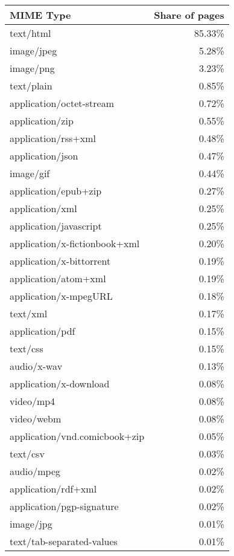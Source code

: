 \ifdgruyter
\begin{center}
\label{table:mime types}
\begin{supertabular}[H]{l|r}
    \textbf{MIME Type} & \textbf{Share of pages}\\
	\hline
	\hline
	text/html			&	85.33\% \\
	\hline
	image/jpeg			&	5.28\% \\
	\hline
	image/png			&	3.23\% \\
	\hline
	text/plain			&	0.85\% \\
	\hline
	application/octet-stream		&	0.72\% \\
	\hline
	application/zip		&	0.55\% \\
	\hline
	application/rss+xml	&	0.48\% \\
	\hline
	application/json	&	0.47\% \\
	\hline
	image/gif			&	0.44\% \\
	\hline
	application/epub+zip			&	0.27\% \\
	\hline
	application/xml		&	0.25\% \\
	\hline
	application/javascript			&	0.25\% \\
	\hline
	application/x-fictionbook+xml	&	0.20\% \\
	\hline
	application/x-bittorrent		&	0.19\% \\
	\hline
	application/atom+xml			&	0.19\% \\
	\hline
	application/x-mpegURL			&	0.18\% \\
	\hline
	text/xml			&	0.17\% \\
	\hline
	application/pdf		&	0.15\% \\
	\hline
	text/css			&	0.15\% \\
	\hline
	audio/x-wav			&	0.13\% \\
	\hline
	application/x-download			&	0.08\% \\
	\hline
	video/mp4			&	0.08\% \\
	\hline
	video/webm			&	0.08\% \\
	\hline
	application/vnd.comicbook+zip	&	0.05\% \\
	\hline
	text/csv			&	0.03\% \\
	\hline
	audio/mpeg			&	0.02\% \\
	\hline
	application/rdf+xml	&	0.02\% \\
	\hline
	application/pgp-signature		&	0.02\% \\
	\hline
	image/jpg			&	0.01\% \\
	\hline
	text/tab-separated-values		&	0.01\% \\

\end{supertabular}
\end{center}
